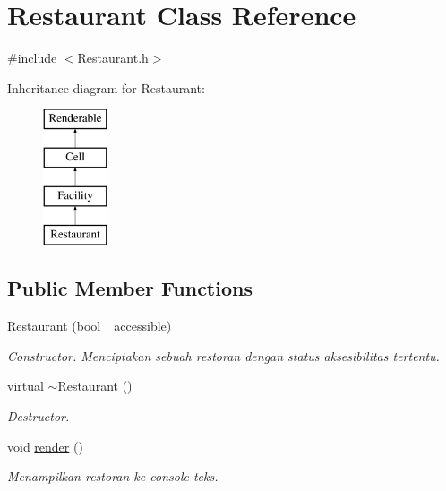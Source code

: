 \hypertarget{classRestaurant}{\section{Restaurant Class Reference}
\label{classRestaurant}
}


{\ttfamily \#include $<$Restaurant.\+h$>$}

Inheritance diagram for Restaurant\+:\begin{figure}[H]
\begin{center}
\leavevmode
\includegraphics[height=4.000000cm]{classRestaurant}
\end{center}
\end{figure}
\subsection*{Public Member Functions}
\begin{DoxyCompactItemize}
\item 
\hyperlink{classRestaurant_a608f7988ea6a74eea642d33c05e1ee0e}{Restaurant} (bool \+\_\+accessible)
\begin{DoxyCompactList}\small\item\em Constructor. Menciptakan sebuah restoran dengan status aksesibilitas tertentu. \end{DoxyCompactList}\item 
\hypertarget{classRestaurant_acb1d786ab04bc4880e79f13d839b9cbc}{virtual \hyperlink{classRestaurant_acb1d786ab04bc4880e79f13d839b9cbc}{$\sim$\+Restaurant} ()}\label{classRestaurant_acb1d786ab04bc4880e79f13d839b9cbc}

\begin{DoxyCompactList}\small\item\em Destructor. \end{DoxyCompactList}\item 
\hypertarget{classRestaurant_a922ef15598aa096dcfe9b9903d181180}{void \hyperlink{classRestaurant_a922ef15598aa096dcfe9b9903d181180}{render} ()}\label{classRestaurant_a922ef15598aa096dcfe9b9903d181180}

\begin{DoxyCompactList}\small\item\em Menampilkan restoran ke console teks. \end{DoxyCompactList}\end{DoxyCompactItemize}
